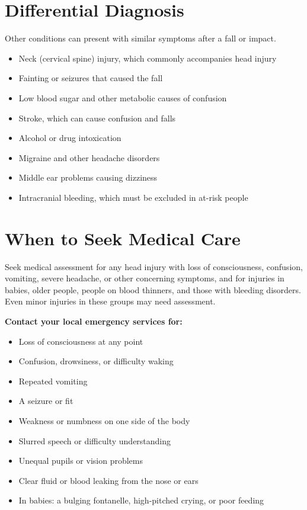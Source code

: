 \section*{Differential Diagnosis}
Other conditions can present with similar symptoms after a fall or impact.

\begin{itemize}
    \item Neck (cervical spine) injury, which commonly accompanies head injury
    \item Fainting or seizures that caused the fall
    \item Low blood sugar and other metabolic causes of confusion
    \item Stroke, which can cause confusion and falls
    \item Alcohol or drug intoxication
    \item Migraine and other headache disorders
    \item Middle ear problems causing dizziness
    \item Intracranial bleeding, which must be excluded in at-risk people
\end{itemize}

\section*{When to Seek Medical Care}
Seek medical assessment for any head injury with loss of consciousness, confusion, vomiting, severe headache, or other concerning symptoms, and for injuries in babies, older people, people on blood thinners, and those with bleeding disorders. Even minor injuries in these groups may need assessment.

\textbf{Contact your local emergency services for:}
\begin{itemize}
    \item Loss of consciousness at any point
    \item Confusion, drowsiness, or difficulty waking
    \item Repeated vomiting
    \item A seizure or fit
    \item Weakness or numbness on one side of the body
    \item Slurred speech or difficulty understanding
    \item Unequal pupils or vision problems
    \item Clear fluid or blood leaking from the nose or ears
    \item In babies: a bulging fontanelle, high-pitched crying, or poor feeding
\end{itemize}

